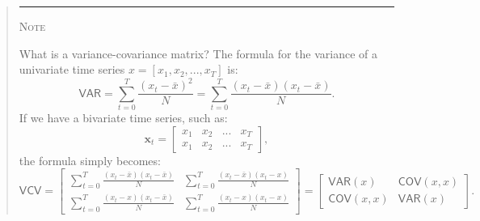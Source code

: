 \documentclass[11pt,a4paper]{report}
\numberwithin{equation}{chapter}
\numberwithin{section}{chapter}
\begin{document}
%
\begin{quotation}
\noindent \rule{1cm}{.4pt}   {\scshape Note}   \hrulefill
\vspace{-.36cm}

\noindent \hrulefill
\small
\singlespacing
\color{note}\sffamily%

What is a variance-covariance matrix? The formula for the variance of a
univariate time series $x=[x_{1},x_{2},...,x_{T}]$ is:%
\begin{equation*}
\mathsf{VAR}=\sum_{t=0}^{T}\frac{\left( x_{t}-\bar{x}\right) ^{2}}{N}%
=\sum_{t=0}^{T}\frac{\left( x_{t}-\bar{x}\right) \left( x_{t}-\bar{x}\right) 
}{N}.
\end{equation*}%
If we have a bivariate time series, such as:%
\begin{equation*}
\mathbf{x}_{t}=\left[ 
\begin{array}{cccc}
x_{1} & x_{2} & ... & x_{T} \\ 
x_{1} & x_{2} & ... & x_{T}%
\end{array}%
\right] ,
\end{equation*}%
the formula simply becomes:%
\begin{equation*}
\mathsf{VCV}=\left[ 
\begin{array}{cc}
\sum_{t=0}^{T}\frac{\left( x_{t}-\bar{x}\right) \left( x_{t}-\bar{x}\right) 
}{N} & \sum_{t=0}^{T}\frac{\left( x_{t}-\bar{x}\right) \left( x_{t}-x\right) 
}{N} \\ 
\sum_{t=0}^{T}\frac{\left( x_{t}-x\right) \left( x_{t}-\bar{x}\right) }{N} & 
\sum_{t=0}^{T}\frac{\left( x_{t}-x\right) \left( x_{t}-x\right) }{N}%
\end{array}%
\right] =\left[ 
\begin{array}{cc}
\mathsf{VAR}(x) & \mathsf{COV}(x,x) \\ 
\mathsf{COV}(x,x) & \mathsf{VAR}(x)%
\end{array}%
\right] .
\end{equation*}

%
\color{black}
\noindent \hrulefill 
\vspace{-.5cm}

\noindent \hrulefill
\end{quotation}
\bigskip%
\end{document}
